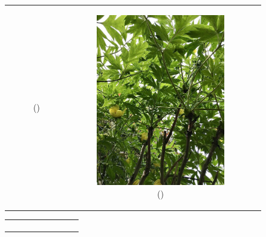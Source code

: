 \documentclass{BachelorBUI}
\begin{document}
\begin{figure}[!h]
\begin{tabular}{ccc}
\begin{subfigure}{0.40\textwidth}
                    \caption{\centering (\cite{2_artificial_background:2019})}
                \end{subfigure} &
                \begin{subfigure}{0.25\textwidth}
                    \centering
                    \includegraphics[width=\textwidth]{3_artificial_background.jpg}
                    \caption{\centering (\cite{3_artificial_background:2022})}
                \end{subfigure} \\
            \end{tabular}
            \begin{tabular}{ccc}
                \begin{subfigure}{0.30\textwidth}
                    \centering

\end{subfigure}
\end{tabular}
\end{figure}
\end{document}
